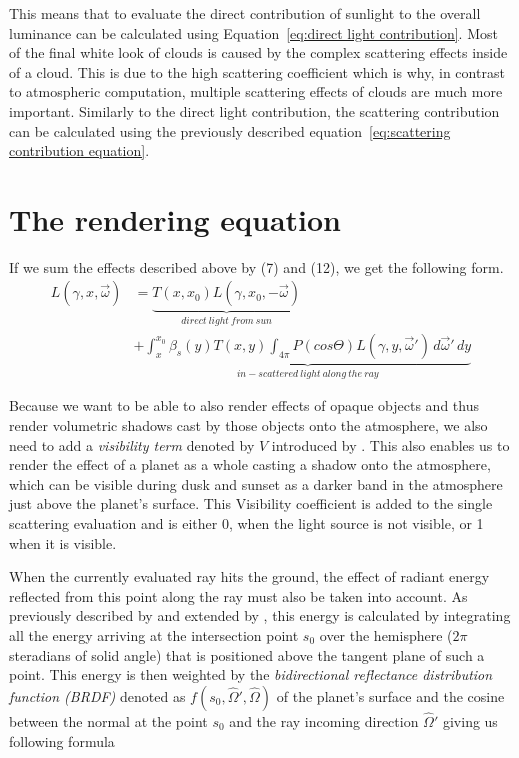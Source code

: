 \documentclass{ctuthesis}
\begin{document}
    This means that to evaluate the direct contribution of sunlight to the overall luminance can be 
    calculated using Equation~\ref{eq:direct light contribution}. Most of the final white
    look of clouds is caused by the complex scattering effects inside of a cloud. This is due to the high scattering
    coefficient which is why, in contrast to atmospheric computation, multiple scattering effects of clouds
    are much more important. Similarly to the direct light contribution, the scattering contribution can be
    calculated using the previously described equation~\ref{eq:scattering contribution equation}. 
\section{The rendering equation}

If we sum the effects described above by (7) and (12), we get the following form. 
\begin{equation}
\begin{split}
    L(\gamma, x, \overrightarrow{\omega}) &= \underbrace{T(x, x_{0}) L(\gamma ,x_{0}, -\overrightarrow{\omega})}_{direct\ light\ from\ sun}\\ 
    &+\underbrace{ \int_{x}^{x_{0}}  \beta_{s}(y) T(x,y)  \int_{4 \pi} P( cos \Theta)  L (\gamma, y, \overrightarrow{\omega}') \,d\overrightarrow{\omega}' \,dy}_{in-scattered\ light\ along\ the\ ray}
\end{split}
\end{equation}

Because we want to be able to also render effects of opaque objects and thus render
volumetric shadows cast by those objects onto the atmosphere, we also need to add a 
\textit{visibility term} denoted by $V$ introduced by \cite{hillaire_2020}. 
This also enables us to render the effect of a planet as a whole casting a shadow onto the atmosphere,
which can be visible during dusk and sunset as a darker band in the atmosphere just above the
planet's surface. This Visibility coefficient is added to the single scattering evaluation and
is either 0, when the light source is not visible, or 1 when it is visible.

When the currently evaluated ray hits the ground, the effect of radiant energy reflected from 
this point along the ray must also be taken into account. As previously described by 
\cite{bruneton_neyret_2008} and extended by \cite{costa_bock_emmart_hansen_ynnerman_silva_2021},
this energy is calculated by integrating all the energy arriving at the intersection point $s_{0}$
over the hemisphere ($2 \pi$ steradians of solid angle) that is positioned above the tangent 
plane of such a point. This energy is then weighted by the \textit{bidirectional reflectance distribution function (BRDF)} 
denoted as $f(s_{0}, \hat{\Omega}',\hat{\Omega})$ of the planet's surface and the cosine between
the normal at the point $s_{0}$ and the ray incoming direction $\hat{\Omega}'$ 
\cite{costa_bock_emmart_hansen_ynnerman_silva_2021} giving us following formula
\end{document}
